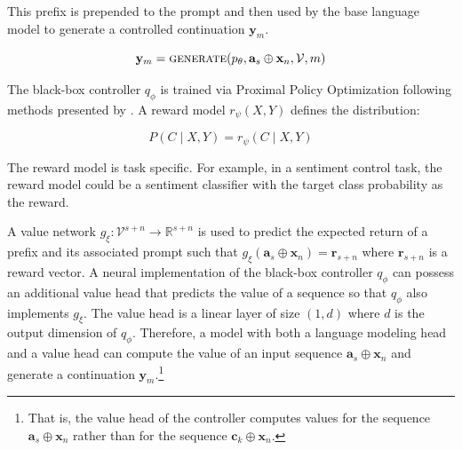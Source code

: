 \documentclass[phd,electronic,oneside,twosidetoc,letterpaper,chaptercenter,parttop,lof]{byumsphd}
\newcommand{\dan}[1]{\textcolor{red}{[#1]}}
\begin{document}
This prefix is prepended to the prompt and then used by the base language model to generate a controlled continuation \(\mathbf{y}_m\).

\begin{equation}
    \mathbf{y}_m = \textrm{\textsc{generate}}(p_\theta, \mathbf{a}_{s} \oplus \mathbf{x}_n, \mathcal{V}, m)
\end{equation}

The black-box controller \(q_\phi\) is trained via Proximal Policy Optimization \cite{schulman2017ppo} following methods presented by \cite{vonwerra2022trl}.
A reward model \(r_\psi(X, Y)\) defines the distribution:

\begin{equation}
    P(C \mid X, Y) = r_\psi(C \mid X, Y)
\end{equation}

The reward model is task specific. For example, in a sentiment control task, the reward model could be a sentiment classifier with the target class probability as the reward.


A value network \(g_\xi : \mathcal{V}^{s+n} \rightarrow \mathbb{R}^{s+n}\) is used to predict the expected return of a prefix and its associated prompt such that \(g_\xi(\mathbf{a}_s \oplus \mathbf{x}_n) = \mathbf{r}_{s+n}\) where \(\mathbf{r}_{s+n}\) is a reward vector.
A neural implementation of the black-box controller \(q_\phi\) can possess an additional value head that predicts the value of a sequence so that \(q_\phi\) also implements \(g_\xi\). The value head is a linear layer of size \((1, d)\) where \(d\) is the output dimension of \(q_\phi\)\cite{vonwerra2022trl}.
Therefore, a model with both a language modeling head and a value head can compute the value of an input sequence \(\mathbf{a}_s \oplus \mathbf{x}_n\) and generate a continuation \(\mathbf{y}_m\).\footnote{That is, the value head of the controller computes values for the sequence $\mathbf{a}_s \oplus \mathbf{x}_n$  rather than for the sequence $\mathbf{c}_k \oplus \mathbf{x}_n$.}
\end{document}
